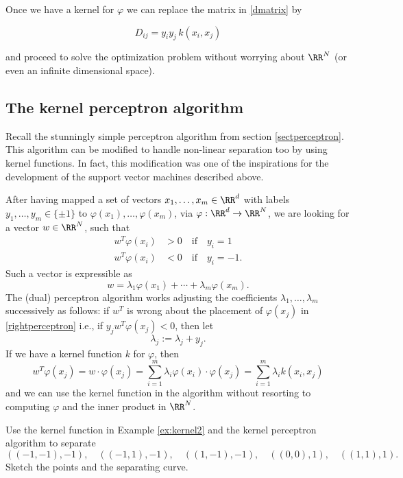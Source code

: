 \documentclass{article}
\begin{document}
  Once we have a kernel for $\varphi$ we can replace the matrix in \eqref{dmatrix} by
  
    \begin{equation*}
    D_{ij} = y_i y_j\, k(x_i, x_j)
  \end{equation*}

  and proceed to solve the optimization problem without worrying about $\RR^N$ (or even an
  infinite dimensional space).

  \subsection{The kernel perceptron algorithm}

  Recall the stunningly simple perceptron algorithm from section
  \ref{sectperceptron}. This algorithm can be modified to handle
  non-linear separation too by using kernel functions. In fact, this
  modification was one of the inspirations for the development of the
  support vector machines described above.

  After having mapped a set of vectors $x_1, \dots, x_m\in \RR^d$ with
  labels $y_1, \dots, y_m\in\{\pm 1\}$ to
  $\varphi(x_1), \dots, \varphi(x_m)$, via $\varphi:\RR^d\rightarrow \RR^N$, we are looking for a vector
  $w\in \RR^N$, such that
  \begin{align}\label{rightperceptron}
    w^T \varphi(x_i) &> 0\quad\text{if}\quad y_i = 1\\
    w^T \varphi(x_i) &< 0\quad\text{if}\quad y_i = -1.
  \end{align}
  Such a vector is expressible as
  $$
  w = \lambda_1 \varphi(x_1) + \cdots + \lambda_m \varphi(x_m).
  $$
  The (dual) perceptron algorithm works adjusting the coefficients
  $\lambda_1, \dots, \lambda_m$ successively as follows: if
  $w^T$ is wrong about the placement of $\varphi(x_j)$ in \eqref{rightperceptron} i.e., 
  if $y_j w^T \varphi(x_j) < 0$, then let
  $$
  \lambda_j := \lambda_j + y_j.
  $$
  If we have a kernel function $k$ for $\varphi$, then
  $$
  w^T \varphi(x_j) = w\cdot \varphi(x_j) = \sum_{i=1}^m \lambda_i \varphi(x_i)\cdot \varphi(x_j) =
  \sum_{i=1}^m \lambda_i k(x_i, x_j)
  $$
  and we can use the kernel function in the algorithm without resorting to computing $\varphi$ and
  the inner product in $\RR^N$.

  \beginshex
  Use the kernel function in Example \ref{ex:kernel2} and the kernel perceptron algorithm to
  separate
  $$
  ((-1, -1), -1), \quad ((-1, 1), -1), \quad ((1, -1), -1), \quad ((0,0), 1), \quad ((1, 1), 1).
  $$
  Sketch the points and the separating curve.
  \endshex
\end{document}
